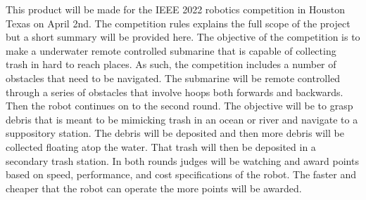 	This product will be made for the IEEE 2022 robotics competition in Houston Texas on April 2nd. The competition rules explains the full scope of the project but a short summary will be provided here. The objective of the competition is to make a underwater remote controlled submarine that is capable of collecting trash in hard to reach places. As such, the competition includes a number of obstacles that need to be navigated. The submarine will be remote controlled through a series of obstacles that involve hoops both forwards and backwards. Then the robot continues on to the second round. The objective will be to grasp debris that is meant to be mimicking trash in an ocean or river and navigate to a suppository station. The debris will be deposited and then more debris will be collected floating atop the water. That trash will then be deposited in a secondary trash station. In both rounds judges will be watching and award points based on speed, performance, and cost specifications of the robot. The faster and cheaper that the robot can operate the more points will be awarded. 